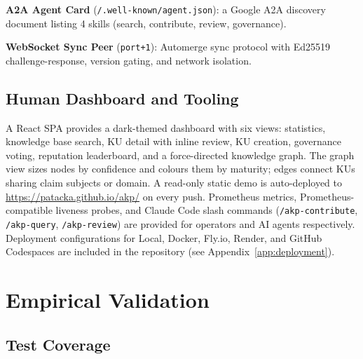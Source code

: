 \documentclass[10pt,twocolumn]{article}
\begin{document}
\textbf{A2A Agent Card} (\texttt{/.well-known/agent.json}): a Google A2A
discovery document listing 4 skills (search, contribute, review, governance).

\textbf{WebSocket Sync Peer} (\texttt{port+1}): Automerge sync protocol with
Ed25519 challenge-response, version gating, and network isolation.

\subsection{Human Dashboard and Tooling}

A React SPA provides a dark-themed dashboard with six views: statistics,
knowledge base search, KU detail with inline review, KU creation, governance
voting, reputation leaderboard, and a force-directed knowledge graph.
The graph view sizes nodes by confidence and colours them by maturity; edges
connect KUs sharing claim subjects or domain. A read-only static demo is
auto-deployed to \url{https://patacka.github.io/akp/} on every push.
Prometheus metrics, Prometheus-compatible liveness probes, and Claude Code
slash commands (\texttt{/akp-contribute}, \texttt{/akp-query},
\texttt{/akp-review}) are provided for operators and AI agents respectively.
Deployment configurations for Local, Docker, Fly.io, Render, and GitHub
Codespaces are included in the repository (see Appendix~\ref{app:deployment}).

\section{Empirical Validation}

\subsection{Test Coverage}
\end{document}
